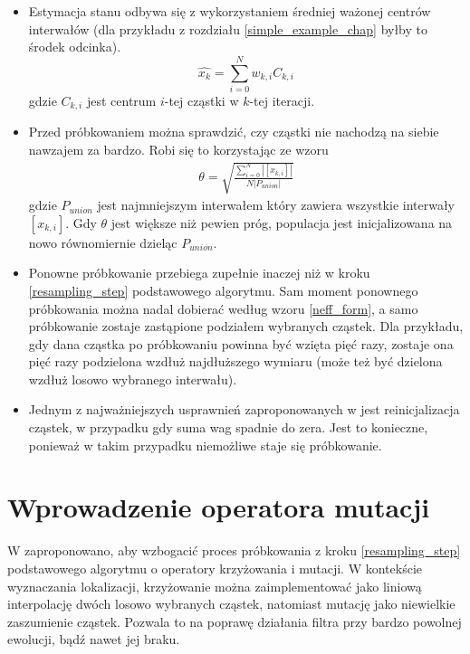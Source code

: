\begin{itemize}
	\item Estymacja stanu odbywa się z wykorzystaniem średniej ważonej centrów interwałów (dla przykładu z rozdziału \ref{simple_example_chap} byłby to środek odcinka).
	\begin{equation} \label{bpf_est}
		\hat{x_k} = \sum_{i=0}^{N} w_{k,i} C_{k,i}
	\end{equation}
	gdzie $C_{k,i}$ jest centrum $i$-tej cząstki w $k$-tej iteracji.
	\item Przed próbkowaniem można sprawdzić, czy cząstki nie nachodzą na siebie nawzajem za bardzo. Robi się to korzystając ze wzoru
	\begin{equation}\label{theta_coeff}
		\begin{aligned}
			\theta = \sqrt{\frac{\sum_{i=0}^{N}|[x_{k,i}]|}{N |P_{union}|}}
		\end{aligned}
	\end{equation}
	gdzie $P_{union}$ jest najmniejszym interwałem który zawiera wszystkie interwały $[x_{k,i}]$. Gdy $\theta$ jest większe niż pewien próg, populacja jest inicjalizowana na nowo równomiernie dzieląc $P_{union}$.
	
	\item Ponowne próbkowanie przebiega zupełnie inaczej niż w kroku \ref{resampling_step} podstawowego algorytmu. Sam moment ponownego próbkowania można nadal dobierać według wzoru \ref{neff_form}, a samo próbkowanie zostaje zastąpione podziałem wybranych cząstek. Dla przykładu, gdy dana cząstka po próbkowaniu powinna być wzięta pięć razy, zostaje ona pięć razy podzielona wzdłuż najdłuższego wymiaru (może też być dzielona wzdłuż losowo wybranego interwału).
	\item Jednym z najważniejszych usprawnień zaproponowanych w \cite{brbpf} jest reinicjalizacja cząstek, w przypadku gdy suma wag spadnie do zera. Jest to konieczne, ponieważ w takim przypadku niemożliwe staje się próbkowanie.
\end{itemize}

\section{Wprowadzenie operatora mutacji} \label{evol_chap}
W \cite{pfgen} zaproponowano, aby wzbogacić proces próbkowania z kroku \ref{resampling_step} podstawowego algorytmu o operatory krzyżowania i mutacji. W kontekście wyznaczania lokalizacji, krzyżowanie można zaimplementować jako liniową interpolację dwóch losowo wybranych cząstek, natomiast mutację jako niewielkie zaszumienie cząstek. Pozwala to na poprawę działania filtra przy bardzo powolnej ewolucji, bądź nawet jej braku.
